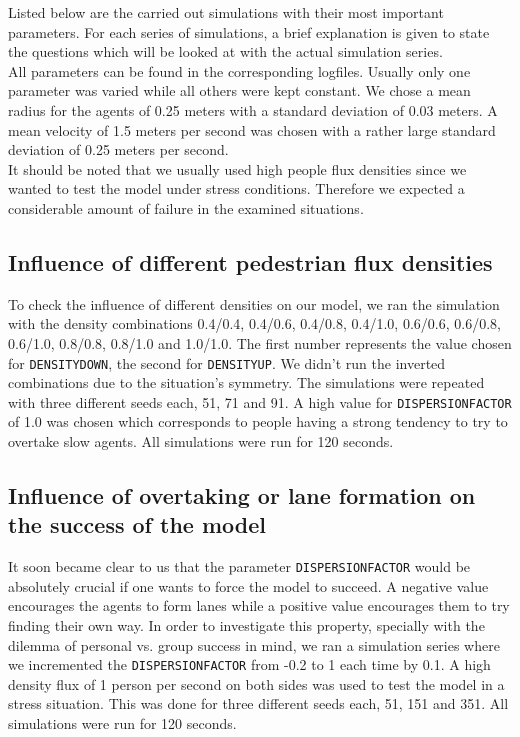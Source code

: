 
\noi Listed below are the carried out simulations with their most important parameters. For each series of simulations, a brief explanation is given to state the questions which will be looked at with the actual simulation series.\\
All parameters can be found in the corresponding logfiles. Usually only one parameter was varied while all others were kept constant. We chose a mean radius for the agents of 0.25 meters with a standard deviation of 0.03 meters. A mean velocity of 1.5 meters per second was chosen with a rather large standard deviation of 0.25 meters per second.\\
It should be noted that we usually used high people flux densities since we wanted to test the model under stress conditions. Therefore we expected a considerable amount of failure in the examined situations.

\subsection{Influence of different pedestrian flux densities}
To check the influence of different densities on our model, we ran the simulation with the density combinations 0.4/0.4, 0.4/0.6, 0.4/0.8, 0.4/1.0, 0.6/0.6, 0.6/0.8, 0.6/1.0, 0.8/0.8, 0.8/1.0 and 1.0/1.0. The first number represents the value chosen for \texttt{DENSITYDOWN}, the second for \texttt{DENSITYUP}. We didn't run the inverted combinations due to the situation's symmetry. The simulations were repeated with three different seeds each, 51, 71 and 91. A high value for \texttt{DISPERSIONFACTOR} of 1.0 was chosen which corresponds to people having a strong tendency to try to overtake slow agents. All simulations were run for 120 seconds.

\subsection{Influence of overtaking or lane formation on the success of the model}
It soon became clear to us that the parameter \texttt{DISPERSIONFACTOR} would be absolutely crucial if one wants to force the model to succeed. A negative value encourages the agents to form lanes while a positive value encourages them to try finding their own way. In order to investigate this property, specially with the dilemma of personal vs. group success in mind, we ran a simulation series where we incremented the \texttt{DISPERSIONFACTOR} from -0.2 to 1 each time by 0.1. A high density flux of 1 person per second on both sides was used to test the model in a stress situation. This was done for three different seeds each, 51, 151 and 351. All simulations were run for 120 seconds.


